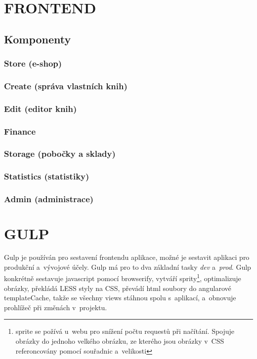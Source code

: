\documentclass[a4paper,12pt,twoside,BCOR=10mm]{article}
\newcommand{\upc}[1]{\uppercase{#1}} %
\renewcommand{\it}[1]{\textit{#1}}    %
\begin{document}
\section{\upc{Frontend}}\label{sec:frontend}
\subsection{Komponenty}
\subsubsection{Store (e-shop)}\label{sec:store}
\subsubsection{Create (správa vlastních knih)}\label{sec:create}
\subsubsection{Edit (editor knih)}\label{sec:edit}
\subsubsection{Finance}\label{sec:finance}
\subsubsection{Storage (pobočky a sklady)}\label{sec:storage}
\subsubsection{Statistics (statistiky)}\label{sec:stats}
\subsubsection{Admin (administrace)}\label{sec:admin}


\section{\upc{Gulp}}
Gulp je používán pro sestavení frontendu aplikace, možné je sestavit aplikaci pro produkční a~vývojové účely. Gulp má pro to dva základní tasky \it{dev} a~\it{prod}. Gulp konkrétně sestavuje javascript pomocí browserify, vytváří sprity\footnote{sprite se požívá u~webu pro snížení počtu requestů při načítání. Spojuje obrázky do jednoho velkého obrázku, ze kterého jsou obrázky v~CSS referoncovány pomocí souřadnic a~velikosti }, optimalizuje obrázky, překládá LESS styly na CSS, převádí html soubory do angularové templateCache, takže se všechny views stáhnou spolu s~aplikací, a~obnovuje prohlížeč při změnách v~projektu.
\end{document}

